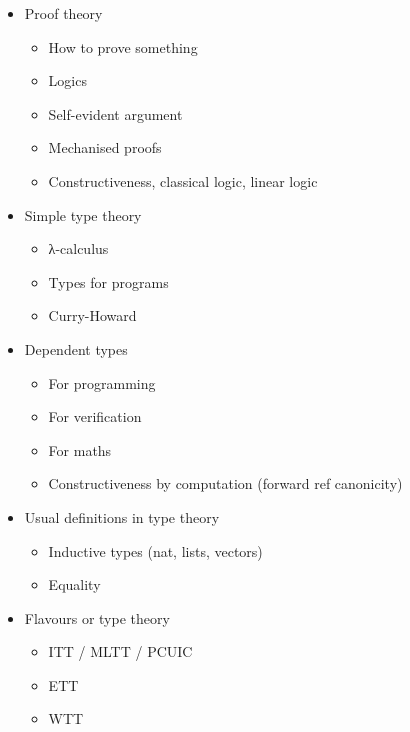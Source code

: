 
\begin{itemize}
  \item Proof theory
    \begin{itemize}
      \item How to prove something
      \item Logics
      \item Self-evident argument
      \item Mechanised proofs
      \item Constructiveness, classical logic, linear logic
    \end{itemize}
  \item Simple type theory
    \begin{itemize}
      \item λ-calculus
      \item Types for programs
      \item Curry-Howard
    \end{itemize}
  \item Dependent types
    \begin{itemize}
      \item For programming
      \item For verification
      \item For maths
      \item Constructiveness by computation (forward ref canonicity)
    \end{itemize}
  \item Usual definitions in type theory
    \begin{itemize}
      \item Inductive types (nat, lists, vectors)
      \item Equality
    \end{itemize}
  \item Flavours or type theory
    \begin{itemize}
      \item ITT / MLTT / PCUIC
      \item ETT
      \item WTT

\end{itemize}
\end{itemize}
